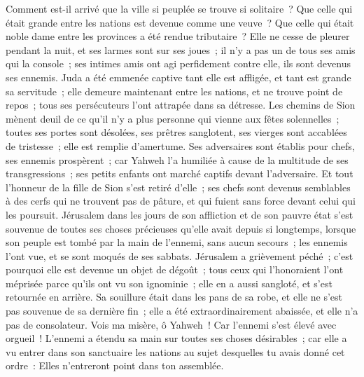 \begin{multicols}{2}
\VerseOne{} Comment est-il arrivé que la ville si peuplée se trouve si solitaire~? Que celle qui était grande entre les nations est devenue comme une veuve~? Que celle qui était noble dame entre les provinces a été rendue tributaire~?
 Elle ne cesse de pleurer pendant la nuit, et ses larmes sont sur ses joues~; il n'y a pas un de tous ses amis qui la console~; ses intimes amis ont agi perfidement contre elle, ils sont devenus ses ennemis.
 Juda a été emmenée captive tant elle est affligée, et tant est grande sa servitude~; elle demeure maintenant entre les nations, et ne trouve point de repos~; tous ses persécuteurs l'ont attrapée dans sa détresse.
 Les chemins de Sion mènent deuil de ce qu'il n'y a plus personne qui vienne aux fêtes solennelles~; toutes ses portes sont désolées, ses prêtres sanglotent, ses vierges sont accablées de tristesse~; elle est remplie d'amertume. 
 Ses adversaires sont établis pour chefs, ses ennemis prospèrent~; car Yahweh l'a humiliée à cause de la multitude de ses transgressions~; ses petits enfants ont marché captifs devant l'adversaire.
 Et tout l'honneur de la fille de Sion s'est retiré d'elle~; ses chefs sont devenus semblables à des cerfs qui ne trouvent pas de pâture, et qui fuient sans force devant celui qui les poursuit.
 Jérusalem dans les jours de son affliction et de son pauvre état s'est souvenue de toutes ses choses précieuses qu'elle avait depuis si longtemps, lorsque son peuple est tombé par la main de l'ennemi, sans aucun secours~; les ennemis l'ont vue, et se sont moqués de ses sabbats.
 Jérusalem a grièvement péché~; c'est pourquoi elle est devenue un objet de dégoût~; tous ceux qui l'honoraient l'ont méprisée parce qu'ils ont vu son ignominie~; elle en a aussi sangloté, et s'est retournée en arrière.
 Sa souillure était dans les pans de sa robe, et elle ne s'est pas souvenue de sa dernière fin~; elle a été extraordinairement abaissée, et elle n'a pas de consolateur. Vois ma misère, ô Yahweh~! Car l'ennemi s'est élevé avec orgueil~!
 L'ennemi a étendu sa main sur toutes ses choses désirables~; car elle a vu entrer dans son sanctuaire les nations au sujet desquelles tu avais donné cet ordre~: Elles n'entreront point dans ton assemblée.

\end{multicols}
